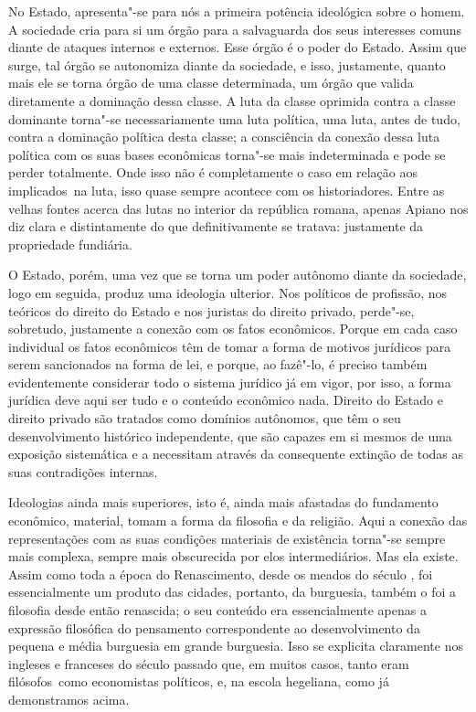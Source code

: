 No Estado, apresenta"-se para nós a primeira potência 
ideológica sobre o homem. A sociedade cria para si um órgão para a
salvaguarda dos seus interesses comuns diante de ataques internos e
externos. Esse órgão é o poder do Estado. Assim que  
surge, tal órgão se autonomiza diante da sociedade, e isso, justamente,
quanto mais ele se torna órgão de uma classe determinada, um órgão que
valida diretamente a dominação dessa classe. A luta da classe oprimida
contra a classe dominante torna"-se necessariamente uma luta política,
uma luta, antes de tudo, contra a dominação política desta classe; a
consciência da conexão dessa luta política com os suas bases
econômicas torna"-se mais indeterminada  
e pode se perder totalmente. Onde isso não é  
completamente o caso em relação aos implicados\est\ na luta, isso quase
sempre acontece com os historiadores. Entre as velhas fontes acerca das
lutas no interior da república romana, apenas Apiano nos diz clara e distintamente do que definitivamente se tratava: justamente da
propriedade fundiária.

O Estado, porém, uma vez que se torna um poder autônomo  
diante da sociedade, logo em seguida, produz uma ideologia ulterior. Nos
políticos de profissão, nos teóricos do direito do Estado e nos juristas
do direito privado, perde"-se, sobretudo, justamente a conexão com os
fatos econômicos. Porque em cada caso individual os fatos econômicos têm
de tomar a forma de motivos jurídicos para serem sancionados na forma de
lei, e porque, ao fazê"-lo, é preciso também evidentemente considerar
todo o sistema jurídico já em vigor, por isso, a forma jurídica deve
aqui ser tudo e o conteúdo econômico nada. Direito do Estado e direito
privado são tratados como domínios autônomos, que têm o seu
desenvolvimento histórico independente, que são capazes em si mesmos de
uma exposição sistemática e a necessitam através da consequente extinção
de todas as suas contradições internas.

Ideologias ainda mais superiores, isto é, ainda mais afastadas do
fundamento econômico, material, tomam a forma da filosofia e da
religião. Aqui a conexão das representações com as suas condições
materiais de existência torna"-se sempre mais complexa, sempre mais
obscurecida por elos intermediários. Mas ela existe. Assim como toda a
época do Renascimento, desde os meados do século , foi essencialmente
um produto das cidades, portanto, da burguesia, também o foi a filosofia
desde então renascida; o seu conteúdo era essencialmente apenas a
expressão filosófica do pensamento correspondente ao desenvolvimento da
pequena e média burguesia em grande burguesia. Isso se explicita
claramente nos ingleses e franceses do século passado que, em muitos
casos, tanto eram filósofos\est\ como economistas políticos, e, na escola
hegeliana, como já demonstramos acima.

